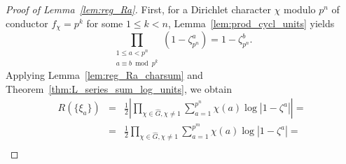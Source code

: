 \begin{proof}[Proof of Lemma~\ref{lem:reg_Ra}]
    First, for a Dirichlet character $\chi$ modulo $p^n$ of conductor 
    $f_{\chi} = p^k$ for some $1 \leq k < n$, Lemma~\ref{lem:prod_cycl_units} yields
    $$
    \prod_{\substack{1 \leq a < p^n \\ a \equiv b \bmod p^k}} (1 - \zeta_{p^n}^a) = 1 - \zeta_{p^n}^b.   
    $$
    Applying Lemma~\ref{lem:reg_Ra_charsum} and Theorem~\ref{thm:L_series_sum_log_units}, we obtain 
    \begin{eqnarray*}
        R(\{\xi_a\}) &=& \frac{1}{2} \left | \prod_{\chi \in \widehat{G}, \chi \ne 1} \sum_{a = 1}^{p^n} \chi(a) \log |1 - \zeta^a| \right | = \\
        &=& \frac{1}{2} \prod_{\chi \in \widehat{G}, \chi \ne 1} \sum_{a = 1}^{p^m} \chi(a) \log |1 - \zeta^a| = \\
    \end{eqnarray*}
\end{proof}

